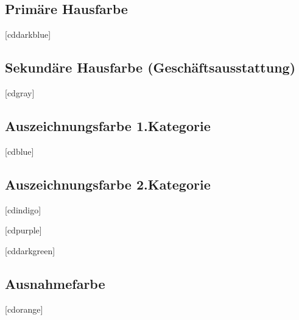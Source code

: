 \subsection{Primäre Hausfarbe}
\begin{Declaration}{[cddarkblue]}
\printdeclarationlist%
\end{Declaration}


\subsection{Sekundäre Hausfarbe (Geschäftsausstattung)}
\begin{Declaration}{[cdgray]}
\printdeclarationlist%
\end{Declaration}


\subsection{Auszeichnungsfarbe 1.Kategorie}
\begin{Declaration}{[cdblue]}
\printdeclarationlist%
\end{Declaration}


\subsection{Auszeichnungsfarbe 2.Kategorie}
\begin{Declaration}{[cdindigo]}
\begin{Declaration}{[cdpurple]}
\begin{Declaration}{[cddarkgreen]}
\end{Declaration}
\end{Declaration}
\end{Declaration}


\subsection{Ausnahmefarbe}
\begin{Declaration}{[cdorange]}
\printdeclarationlist%
\end{Declaration}


